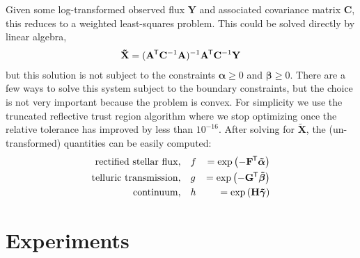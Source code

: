 \documentclass[modern]{aastex631}
\renewcommand{\vec}[1]{\mathbf{#1}}
\newcommand{\vecalpha}{\boldsymbol{\alpha}}
\newcommand{\vecbeta}{\boldsymbol{\beta}}
\newcommand*{\transpose}{^{\mkern-1.5mu\mathsf{T}}}
\newcommand{\todo}[1]{\textcolor{tab:red}{#1}}
\begin{document}
Given some log-transformed observed flux $\vec{Y}$ and associated covariance matrix $\vec{C}$, this reduces to a weighted least-squares problem. This could be solved directly by linear algebra,
\begin{eqnarray}
    \vec{\tilde{X}} = (\vec{A}\transpose\vec{C}^{-1}\vec{A})^{-1}\vec{A}\transpose\vec{C}^{-1}\vec{Y}
\end{eqnarray}
\noindent{}but this solution is not subject to the constraints $\vecalpha \geq 0$ and $\vecbeta \geq 0$. There are a few ways to solve this system subject to the boundary constraints, but the choice is not very important because the problem is convex. For simplicity we use the truncated reflective trust region algorithm where we stop optimizing once the relative tolerance has improved by less than $10^{-16}$.
After solving for $\vec{\tilde{X}}$, the (un-transformed) quantities can be easily computed:
\begin{eqnarray}
    \mathrm{rectified~stellar~flux}, \quad &f& = \exp{\left(-\vec{F}\transpose\boldsymbol{\tilde{\alpha}}\right)} \\
    \mathrm{telluric~transmission},\quad  &g& = \exp{\left(-\vec{G}\transpose\boldsymbol{\tilde{\beta}}\right)} \\
    \mathrm{continuum}, \quad &h& = \exp{\left(\vec{H}\boldsymbol{\tilde{\gamma}}\right)}
\end{eqnarray}


\section{Experiments} \label{sec:experiments}
\end{document}
